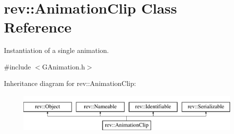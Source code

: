 \hypertarget{classrev_1_1_animation_clip}{}\section{rev\+::Animation\+Clip Class Reference}
\label{classrev_1_1_animation_clip}


Instantiation of a single animation.  




{\ttfamily \#include $<$G\+Animation.\+h$>$}

Inheritance diagram for rev\+::Animation\+Clip\+:\begin{figure}[H]
\begin{center}
\leavevmode
\includegraphics[height=2.000000cm]{classrev_1_1_animation_clip}
\end{center}
\end{figure}
